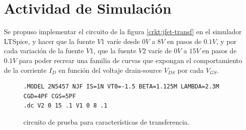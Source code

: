   \section{Actividad de Simulación}
    Se propuso implementar el circuito de la figura \ref{crkt:jfet-transf} en el simulador LTSpice, y hacer que la fuente
    $V1$ varíe desde $0V$ a $8V$ en pasos de $0.1V$, y por cada variación de la fuente $V1$, que la fuente $V2$ varíe de
    $0V$ a $15V$ en pasos de $0.1V$ para poder recrear una familia de curvas que expongan el comportamiento de la
    corriente $I_D$ en función del voltaje drain-source $V_{DS}$ por cada $V_{GS}$.
    \begin{figure}[!ht]
      \centering
      \begin{minipage}{0.45\textwidth}
        \caption{circuito de prueba para características de transferencia.}
        \label{crkt:jfet-sal}
      \end{minipage}
      \hfill
      \begin{minipage}{0.45\textwidth}
        \begin{lstlisting}[style=ltspice, caption={Parámetros de simulación LTspice}, label=list:jfet-transf]
.MODEL 2N5457 NJF IS=1N VT0=-1.5 BETA=1.125M LAMBDA=2.3M CGD=4PF CGS=5PF
.dc V2 0 15 .1 V1 0 8 .1
        \end{lstlisting}
      \end{minipage}
    \end{figure}

